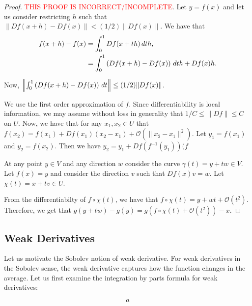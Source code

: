 \begin{proof}
\textcolor{red}{THIS PROOF IS INCORRECT/INCOMPLETE}.
Let $y = f(x)$ and let us consider restricting $h$ such that $\|Df(x+h)-Df(x)\|<(1/2)\|Df(x)\|$. We have that 
\begin{align}
f(x+h) - f(x) & = \int_0^1 Df(x+ th) \, dt h,\\
&  = \int_0^1 \left(Df(x+h) - Df(x)\right)\, dt h + Df(x)h.
\end{align}

Now, $\left\|\int_0^1 \left(Df(x+h) - Df(x)\right)\, dt\right\| \leq (1/2) \|Df(x)\|$.

We use the first order approximation of $f$. Since differentiability is local information, we may assume without loss in generality that $1/C \leq \|Df\| \leq C$ on $U$. Now, we have that for any $x_1, x_2 \in U$ that $f(x_2) = f(x_1) + Df(x_1) (x_2 - x_1) + \mathcal O(\|x_2 - x_1\|^2)$. Let $y_1 = f(x_1)$ and $y_2 = f(x_2)$. Then we have $y_2 = y_1 + Df(f^{-1}(y_1)) (f$

At any point $y\in V$ and any direction $w$ consider the curve $\gamma(t) = y + tw \in V$. Let $f(x) = y$ and consider the direction $v$ such that $Df(x)v = w$. Let $\chi(t) = x + tv \in U$.

From the differentiabilty of $f\circ \chi(t)$, we have that $f\circ \chi(t)  = y + wt + \mathcal O(t^2).$ Therefore, we get that $g(y+tw) - g(y) = g(f\circ\chi(t) + \mathcal O(t^2)) - x$.
\end{proof}


\subsection{Weak Derivatives}

Let us motivate the Sobolev notion of weak derivative. For weak derivatives in the Sobolev sense, the weak derivative captures how the function changes in the average. Let us first examine the integration by parts formula for weak derivatives:

\begin{equation}
a
\end{equation}